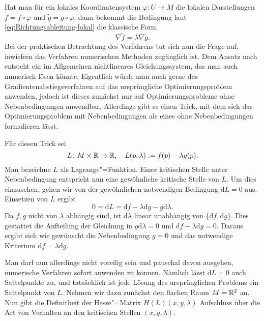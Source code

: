Hat man für ein lokales Koordinatensystem $\varphi\colon U\to M$ die
lokalen Darstellungen $\tilde f = f\circ\varphi$ und
$\tilde g = g\circ\varphi$, dann bekommt die Bedingung laut
\eqref{eq:Richtungsableitung-lokal} die klassische Form
\begin{equation}
\nabla\tilde f = \lambda\nabla\tilde g.
\end{equation}
Bei der praktischen Betrachtung des Verfahrens tut sich nun die
Frage auf, inwiefern das Verfahren numerischen Methoden zugänglich
ist. Dem Ansatz nach entsteht ein im Allgemeinen nichtlineares
Gleichungssystem, das man auch numerisch lösen könnte. Eigentlich
würde man auch gerne das Gradientenabstiegsverfahren auf das
ursprüngliche Optimierungsproblem anwenden, jedoch ist dieses
zunächst nur auf Optimierungsprobleme ohne Nebenbedingungen anwendbar.
Allerdings gibt es einen Trick, mit dem sich das Optimierungsproblem
mit Nebenbedingungen als eines ohne Nebenbedingungen formulieren lässt.

Für diesen Trick sei
\begin{equation}
L\colon M\times\mathbb R\to\mathbb R,\quad L(p,\lambda) := f(p)-\lambda g(p).
\end{equation}
Man bezeichne $L$ als Lagrange"=Funktion. Einer kritischen Stelle unter
Nebenbedingung entspricht nun eine gewöhnliche kritische Stelle von $L$.
Um dies einzusehen, gehen wir von der gewöhnlichen notwendigen
Bedingung $\mathrm dL=0$ aus. Einsetzen von $L$ ergibt
\begin{equation}
0 = \mathrm dL = \mathrm df-\lambda\mathrm dg-g\mathrm d\lambda.
\end{equation}
Da $f,g$ nicht von $\lambda$ abhängig sind, ist $\mathrm d\lambda$
linear unabhängig von $\{\mathrm df,\mathrm dg\}$. Dies gestattet
die Aufteilung der Gleichung in $g\mathrm d\lambda=0$
und $\mathrm df-\lambda\mathrm dg=0$. Daraus ergibt sich wie
gewünscht die Nebenbedingung $g=0$ und das notwendige Kriterium
$\mathrm df=\lambda\mathrm dg$.

Man darf nun allerdings nicht voreilig sein und pauschal davon
ausgehen, numerische Verfahren sofort anwenden zu können. Nämlich
lässt $\mathrm dL=0$ auch Sattelpunkte zu, und tatsächlich ist
jede Lösung des ursprünglichen Problems ein Sattelpunkt von $L$.
Nehmen wir dazu zunächst den flachen Raum $M=\mathbb R^2$ an. Nun gibt
die Definitheit der Hesse"=Matrix $H(L)(x,y,\lambda)$ Aufschluss
über die Art von Verhalten an den kritischen Stellen $(x,y,\lambda)$.

